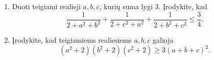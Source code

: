 \begin{enumerate}
  \item {} Duoti teigiami realieji $a,b,c$, kurių suma
    lygi 3. Įrodykite, kad
    $$\frac{1}{2+a^2+b^2}+\frac{1}{2+c^2+a^2}+\frac{1}{2+b^2+c^2}\leq\frac{3}{4}.$$
  \item {} Įrodykite, kad teigiamiems realiesiems
    $a,b,c$ galioja $$(a^2+2)(b^2+2)(c^2+2)\geq3(a+b+c)^2.$$
\end{enumerate}

